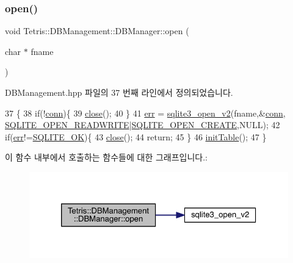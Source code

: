 \subsubsection{\texorpdfstring{open()}{open()}}
{\footnotesize\ttfamily void Tetris\+::\+D\+B\+Management\+::\+D\+B\+Manager\+::open (\begin{DoxyParamCaption}\item[{char $\ast$}]{fname }\end{DoxyParamCaption})\hspace{0.3cm}{\ttfamily [inline]}}



D\+B\+Management.\+hpp 파일의 37 번째 라인에서 정의되었습니다.


\begin{DoxyCode}
37                                   \{
38                 \textcolor{keywordflow}{if}(!\hyperlink{class_tetris_1_1_d_b_management_1_1_d_b_manager_acc2c19420c2b1b1b2c1e724b3a8ec4b7}{conn})\{
39                     \hyperlink{class_tetris_1_1_d_b_management_1_1_d_b_manager_a8390e6ddf3fa06e90fa5c2ab4997e5c1}{close}();
40                 \}
41                 \hyperlink{class_tetris_1_1_d_b_management_1_1_d_b_manager_a9ea8d963f1a9b8117fa5e92b54eda114}{err} = \hyperlink{sqlite3_8h_a140fe275b6975dc867cea50a65a217c4}{sqlite3\_open\_v2}(fname,&\hyperlink{class_tetris_1_1_d_b_management_1_1_d_b_manager_acc2c19420c2b1b1b2c1e724b3a8ec4b7}{conn},
      \hyperlink{sqlite3_8h_a3eb39cf04a78fae3b553b96d65f93419}{SQLITE\_OPEN\_READWRITE}|\hyperlink{sqlite3_8h_a06cff06321a46ca610a29c8f125f9c08}{SQLITE\_OPEN\_CREATE},NULL);
42                 \textcolor{keywordflow}{if}(\hyperlink{class_tetris_1_1_d_b_management_1_1_d_b_manager_a9ea8d963f1a9b8117fa5e92b54eda114}{err}!=\hyperlink{sqlite3_8h_a650d09c7bec7ddadb7c8aa3519dc842c}{SQLITE\_OK})\{
43                     \hyperlink{class_tetris_1_1_d_b_management_1_1_d_b_manager_a8390e6ddf3fa06e90fa5c2ab4997e5c1}{close}();
44                     \textcolor{keywordflow}{return};
45                 \}
46                 \hyperlink{class_tetris_1_1_d_b_management_1_1_d_b_manager_a07a391f97339bacd983f2598dd7a3ade}{initTable}();
47             \}
\end{DoxyCode}
이 함수 내부에서 호출하는 함수들에 대한 그래프입니다.\+:
\nopagebreak
\begin{figure}[H]
\begin{center}
\leavevmode
\includegraphics[width=324pt]{da/d79/class_tetris_1_1_d_b_management_1_1_d_b_manager_a8bf7e756a9cca7e57fef00076fb62f36_cgraph}
\end{center}
\end{figure}
